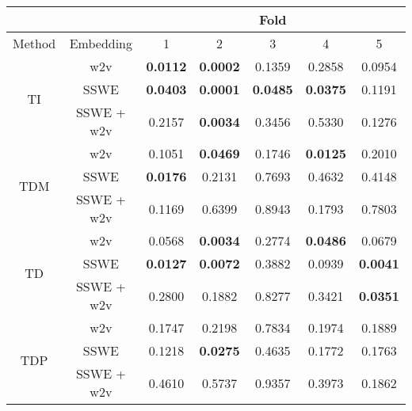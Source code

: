 \begin{tabular}{|c|c|c|c|c|c|c|}
\hline
  &       &  \multicolumn{5}{c|}{Fold} \\
\hline
 Method &   Embedding    &  1 &  2 &  3 &  4 &  5 \\
\hline
\multirow{3}{*}{TI} & w2v &  \textbf{0.0112} &  \textbf{0.0002} &  0.1359 &  0.2858 &  0.0954 \\
& SSWE &  \textbf{0.0403} &  \textbf{0.0001} &  \textbf{0.0485} &  \textbf{0.0375} &  0.1191 \\
& SSWE + w2v &  0.2157 &  \textbf{0.0034} &  0.3456 &  0.5330 &  0.1276 \\
\hline
\multirow{3}{*}{TDM} & w2v &  0.1051 &  \textbf{0.0469} &  0.1746 &  \textbf{0.0125} &  0.2010 \\
& SSWE &  \textbf{0.0176} &  0.2131 &  0.7693 &  0.4632 &  0.4148 \\
& SSWE + w2v &  0.1169 &  0.6399 &  0.8943 &  0.1793 &  0.7803 \\
\hline
\multirow{3}{*}{TD} & w2v &  0.0568 &  \textbf{0.0034} &  0.2774 &  \textbf{0.0486} &  0.0679 \\
& SSWE &  \textbf{0.0127} &  \textbf{0.0072} &  0.3882 &  0.0939 &  \textbf{0.0041} \\
& SSWE + w2v &  0.2800 &  0.1882 &  0.8277 &  0.3421 &  \textbf{0.0351} \\
\hline
\multirow{3}{*}{TDP} & w2v &  0.1747 &  0.2198 &  0.7834 &  0.1974 &  0.1889 \\
& SSWE &  0.1218 &  \textbf{0.0275} &  0.4635 &  0.1772 &  0.1763 \\
& SSWE + w2v &  0.4610 &  0.5737 &  0.9357 &  0.3973 &  0.1862 \\
\hline
\end{tabular}